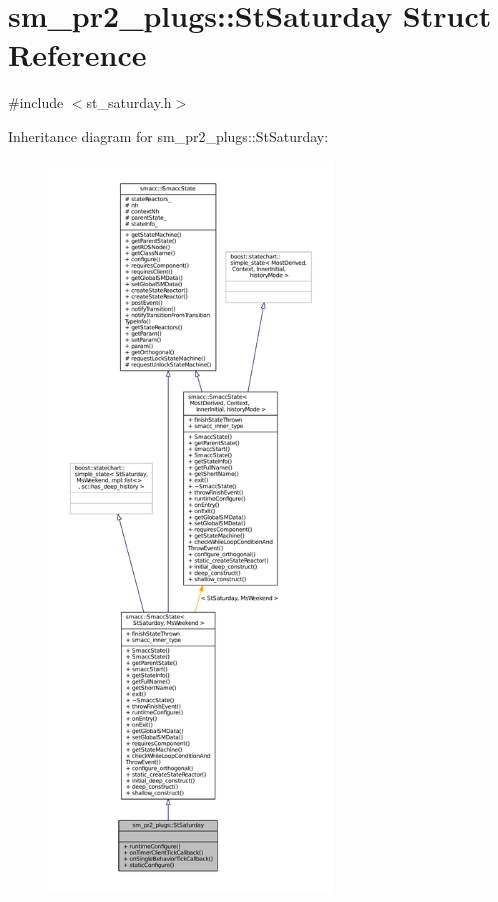\hypertarget{structsm__pr2__plugs_1_1StSaturday}{}\section{sm\+\_\+pr2\+\_\+plugs\+:\+:St\+Saturday Struct Reference}
\label{structsm__pr2__plugs_1_1StSaturday}


{\ttfamily \#include $<$st\+\_\+saturday.\+h$>$}



Inheritance diagram for sm\+\_\+pr2\+\_\+plugs\+:\+:St\+Saturday\+:
\nopagebreak
\begin{figure}[H]
\begin{center}
\leavevmode
\includegraphics[height=550pt]{structsm__pr2__plugs_1_1StSaturday__inherit__graph}
\end{center}
\end{figure}


